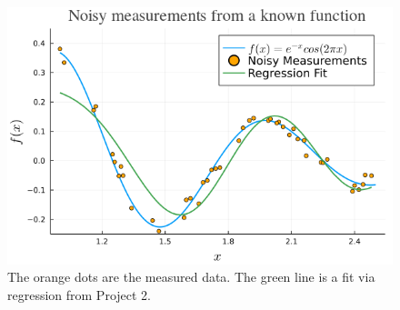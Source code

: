 \begin{figure}[hbt]%
    \centering
\includegraphics[trim=0 0 0 30,clip,height=0.4\textwidth]{graphics/Chap12Optim/FunctionProject2.png}
\caption[]{ The orange dots are the measured data. The green line is a fit via regression from Project 2.
}
\label{fig:Project2_a}%
\end{figure}

